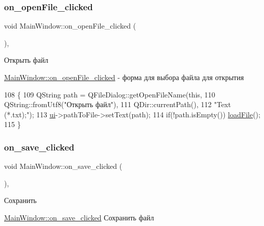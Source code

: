 \subsubsection{\texorpdfstring{on\+\_\+open\+File\+\_\+clicked}{on\_openFile\_clicked}}
{\footnotesize\ttfamily void Main\+Window\+::on\+\_\+open\+File\+\_\+clicked (\begin{DoxyParamCaption}{ }\end{DoxyParamCaption})\hspace{0.3cm}{\ttfamily [private]}, {\ttfamily [slot]}}



Открыть файл 

\hyperlink{class_main_window_ad157e69c40c80314586029f2a7c5e549}{Main\+Window\+::on\+\_\+open\+File\+\_\+clicked} -\/ форма для выбора файла для открытия 
\begin{DoxyCode}
108 \{
109     QString path = QFileDialog::getOpenFileName(\textcolor{keyword}{this},
110                                 QString::fromUtf8(\textcolor{stringliteral}{"Открыть файл"}),
111                                 QDir::currentPath(),
112                                 \textcolor{stringliteral}{"Text (*.txt);"});
113     \hyperlink{class_main_window_a35466a70ed47252a0191168126a352a5}{ui}->pathToFile->setText(path);
114     \textcolor{keywordflow}{if}(!path.isEmpty()) \hyperlink{class_main_window_abc114bfc2f3b523486d89887e7877aea}{loadFile}();
115 \}
\end{DoxyCode}
\hypertarget{class_main_window_a06fb14e8cace4221ee7a721c961934ce}{}\label{class_main_window_a06fb14e8cace4221ee7a721c961934ce} 
\subsubsection{\texorpdfstring{on\+\_\+save\+\_\+clicked}{on\_save\_clicked}}
{\footnotesize\ttfamily void Main\+Window\+::on\+\_\+save\+\_\+clicked (\begin{DoxyParamCaption}{ }\end{DoxyParamCaption})\hspace{0.3cm}{\ttfamily [private]}, {\ttfamily [slot]}}



Сохранить 

\hyperlink{class_main_window_a06fb14e8cace4221ee7a721c961934ce}{Main\+Window\+::on\+\_\+save\+\_\+clicked} Сохранить файл

